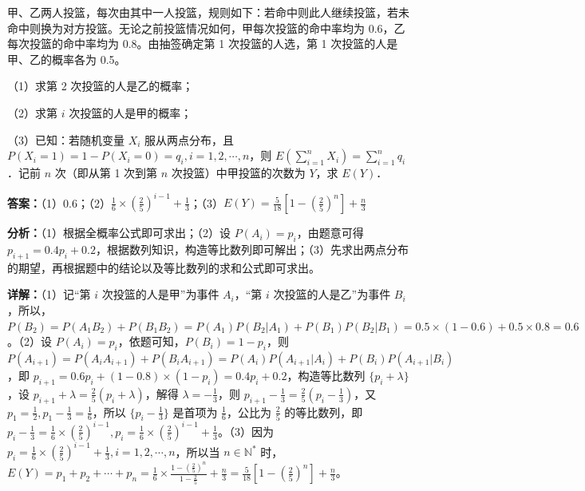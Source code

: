 \begin{question}[points=12]
甲、乙两人投篮，每次由其中一人投篮，规则如下：若命中则此人继续投篮，若未命中则换为对方投篮。无论之前投篮情况如何，甲每次投篮的命中率均为 0.6，乙每次投篮的命中率均为 0.8。由抽签确定第 1 次投篮的人选，第 1 次投篮的人是甲、乙的概率各为 0.5。

（1）求第 2 次投篮的人是乙的概率；

（2）求第 $i$ 次投篮的人是甲的概率；

（3）已知：若随机变量 $X_i$ 服从两点分布，且 $P(X_i=1)=1-P(X_i=0)=q_i, i=1,2,\cdots,n$，则 $E(\sum_{i=1}^n X_i)=\sum_{i=1}^n q_i$．记前 $n$ 次（即从第 1 次到第 $n$ 次投篮）中甲投篮的次数为 $Y$，求 $E(Y)$．
\begin{solution}
\textbf{答案：}（1）0.6；（2）$\frac{1}{6}\times(\frac{2}{5})^{i-1}+\frac{1}{3}$；（3）$E(Y)=\frac{5}{18}[1-(\frac{2}{5})^n]+\frac{n}{3}$

\textbf{分析：}（1）根据全概率公式即可求出；（2）设 $P(A_i)=p_i$，由题意可得 $p_{i+1}=0.4p_i+0.2$，根据数列知识，构造等比数列即可解出；（3）先求出两点分布的期望，再根据题中的结论以及等比数列的求和公式即可求出。

\textbf{详解：}（1）记“第 $i$ 次投篮的人是甲”为事件 $A_i$，“第 $i$ 次投篮的人是乙”为事件 $B_i$，所以，$P(B_2)=P(A_1B_2)+P(B_1B_2)=P(A_1)P(B_2|A_1)+P(B_1)P(B_2|B_1)=0.5\times(1-0.6)+0.5\times0.8=0.6$。（2）设 $P(A_i)=p_i$，依题可知，$P(B_i)=1-p_i$，则 $P(A_{i+1})=P(A_iA_{i+1})+P(B_iA_{i+1})=P(A_i)P(A_{i+1}|A_i)+P(B_i)P(A_{i+1}|B_i)$，即 $p_{i+1}=0.6p_i+(1-0.8)\times(1-p_i)=0.4p_i+0.2$，构造等比数列 $\{p_i+\lambda\}$，设 $p_{i+1}+\lambda=\frac{2}{5}(p_i+\lambda)$，解得 $\lambda=-\frac{1}{3}$，则 $p_{i+1}-\frac{1}{3}=\frac{2}{5}(p_i-\frac{1}{3})$，又 $p_1=\frac{1}{2}, p_1-\frac{1}{3}=\frac{1}{6}$，所以 $\{p_i-\frac{1}{3}\}$ 是首项为 $\frac{1}{6}$，公比为 $\frac{2}{5}$ 的等比数列，即 $p_i-\frac{1}{3}=\frac{1}{6}\times(\frac{2}{5})^{i-1}, p_i=\frac{1}{6}\times(\frac{2}{5})^{i-1}+\frac{1}{3}$。（3）因为 $p_i=\frac{1}{6}\times(\frac{2}{5})^{i-1}+\frac{1}{3}, i=1,2,\cdots,n$，所以当 $n\in\mathbb{N}^*$ 时，$E(Y)=p_1+p_2+\cdots+p_n=\frac{1}{6}\times\frac{1-(\frac{2}{5})^n}{1-\frac{2}{5}}+\frac{n}{3}=\frac{5}{18}[1-(\frac{2}{5})^n]+\frac{n}{3}$。
\end{solution}
\end{question}


